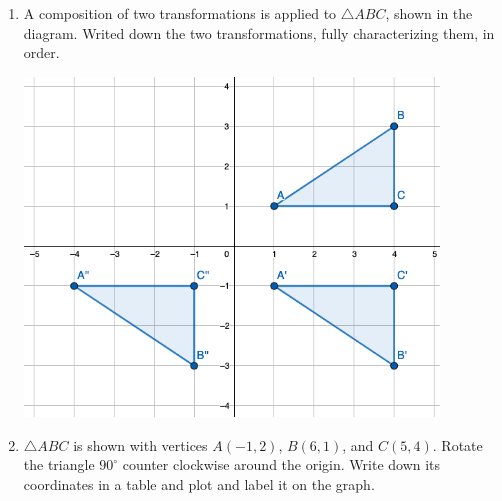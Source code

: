 \begin{enumerate}
\item A composition of two transformations is applied to $\triangle ABC$, shown in the diagram. Writed down the two transformations, fully characterizing them, in order.
\begin{flushright}
  \includegraphics[width=11cm]{../graphics/08reflect+translate.png}
\end{flushright}

\newpage
\item $\triangle ABC$ is shown with vertices $A(-1,2)$, $B(6,1)$, and $C(5,4)$. Rotate the triangle $90^\circ$ counter clockwise around the origin. Write down its coordinates in a table and plot and label it on the graph.
  \begin{flushright}
    \end{flushright}


\end{enumerate}
